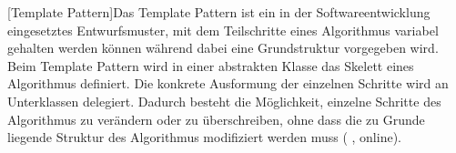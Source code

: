 \begin{acronym}
    [Template Pattern]{Das Template Pattern ist ein in der Softwareentwicklung eingesetztes Entwurfsmuster, mit dem Teilschritte eines Algorithmus variabel gehalten werden können während dabei eine Grundstruktur vorgegeben wird. Beim Template Pattern wird in einer abstrakten Klasse das Skelett eines Algorithmus definiert. Die konkrete Ausformung der einzelnen Schritte wird an Unterklassen delegiert. Dadurch besteht die Möglichkeit, einzelne Schritte des Algorithmus zu verändern oder zu überschreiben, ohne dass die zu Grunde liegende Struktur des Algorithmus modifiziert werden muss (\citeauthor{wikipedia_schablonenmethode_2018} \citeyear{wikipedia_schablonenmethode_2018}, online).}
\end{acronym}
